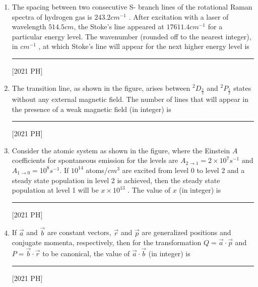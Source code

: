 \documentclass[journal]{IEEEtran}
\begin{document}
\begin{enumerate}
\hfill [2021 PH]
\item The spacing between two consecutive S- 
branch lines of the rotational Raman
spectra of hydrogen gas is $243. 2 cm^{-1}$
. After excitation with a laser of
wavelength $514.5 cm$, the Stoke's line appeared at $17611.4 cm^{-1}$
for a
particular energy level. The wavenumber (rounded off to the nearest
integer), in $cm^{-1}$
, at which Stoke's line will appear for the next higher energy
level is \rule{2cm}{0.4pt}\hfill [2021 PH]
\item The transition line, as shown in the figure, arises between $^2D_{\frac{3}{2}}$ and $^2P_\frac{1}{2}$ states without any external magnetic field. The number of
lines that will appear in the presence of a weak magnetic field (in integer) is \rule{2cm}{0.4pt} \hfill [2021 PH] 

\item Consider the atomic system as shown in the figure, where the Einstein $A$
coefficients for spontaneous emission for the levels are $A_{2 \to 1} = 2 \times 10^7 s^{-1}$ and $A_{1 \to 0} = 10^8 s^{-1}$. If $10^{14}$ atoms/$cm^3$ are excited from level 0 to level 2 and a steady state population in level 2 is achieved, then the steady state
population at level 1 will be $x \times 10^{13} $
. The value of $x$ (in integer) is \rule{2cm}{0.4pt}\hfill [2021 PH] 

\item If $\vec{a}$ and $\vec{b}$ are constant vectors, $\vec{r}$ and $\vec{p}$ are generalized positions and
conjugate momenta, respectively, then for the transformation $Q = \vec{a}\cdot \vec{p}$ and
$P = \vec{b} \cdot \vec{r}$ to be canonical, the value of $\vec{a} \cdot \vec{b}$ (in integer) is \rule{2cm}{0.4pt}\hfill [2021 PH]


\end{enumerate}
\end{document}
